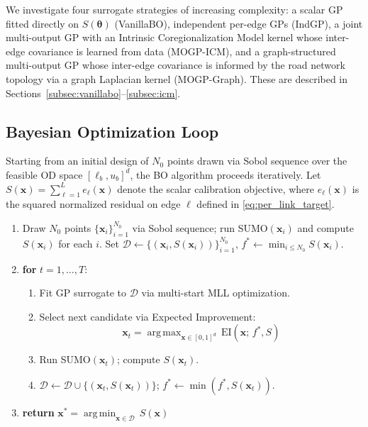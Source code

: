 \documentclass[11pt]{article}
\DeclareMathOperator*{\argmax}{arg\,max}
\DeclareMathOperator*{\argmin}{arg\,min}
\begin{document}
We investigate four surrogate strategies of increasing complexity:
a scalar GP fitted directly on $S(\boldsymbol{\theta})$ (VanillaBO),
independent per-edge GPs (IndGP),
a joint multi-output GP with an Intrinsic Coregionalization Model kernel
whose inter-edge covariance is learned from data (MOGP-ICM),
and a graph-structured multi-output GP whose inter-edge covariance is
informed by the road network topology via a graph Laplacian kernel
(MOGP-Graph). These are described in
Sections~\ref{subsec:vanillabo}--\ref{subsec:icm}.





\subsection{Bayesian Optimization Loop}
Starting from an initial design of $N_0$ points drawn via Sobol
sequence over the feasible OD space $[\ell_b, u_b]^d$, the BO
algorithm proceeds iteratively. Let
$S(\mathbf{x}) = \sum_{\ell=1}^{L} e_\ell(\mathbf{x})$
denote the scalar calibration objective, where
$e_\ell(\mathbf{x})$ is the squared normalized residual on edge $\ell$
defined in \eqref{eq:per_link_target}.

\begin{enumerate}
    \item Draw $N_0$ points $\{\mathbf{x}_i\}_{i=1}^{N_0}$ via Sobol
    sequence; run SUMO$(\mathbf{x}_i)$ and compute
    $S(\mathbf{x}_i)$ for each $i$.
    Set $\mathcal{D} \leftarrow \{(\mathbf{x}_i, S(\mathbf{x}_i))\}_{i=1}^{N_0}$,\quad
    $f^* \leftarrow \min_{i \leq N_0} S(\mathbf{x}_i)$.

    \item \textbf{for} $t = 1, \dots, T$:
    \begin{enumerate}
        \item Fit GP surrogate to $\mathcal{D}$ via
              multi-start MLL optimization.
        \item Select next candidate via Expected Improvement:
        \[
        \mathbf{x}_{t} = \argmax_{\mathbf{x} \in [0,1]^d}\,
        \mathrm{EI}(\mathbf{x};\, f^*, S)
        \]
        \item Run SUMO$(\mathbf{x}_t)$; compute $S(\mathbf{x}_t)$.
        \item $\mathcal{D} \leftarrow \mathcal{D} \cup
              \{(\mathbf{x}_t, S(\mathbf{x}_t))\}$;\quad
              $f^* \leftarrow \min(f^*, S(\mathbf{x}_t))$.
    \end{enumerate}

    \item \textbf{return}
    $\mathbf{x}^* = \argmin_{\mathbf{x} \in \mathcal{D}}\, S(\mathbf{x})$
\end{enumerate}
\end{document}
